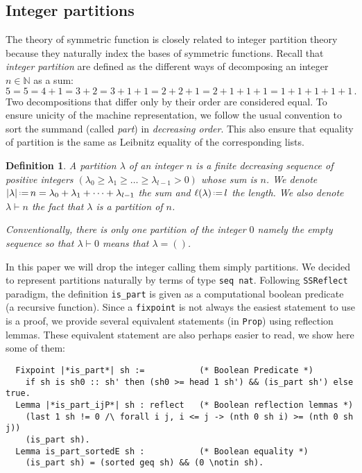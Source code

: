 \documentclass[12pt]{article}
\let\verb=\lstinline
\newcommand{\SSR}{\texttt{SSReflect}\xspace}
\newcommand{\N}{{\mathbb N}}
\newcommand{\partof}{\vdash}                    % Partition de
\newcommand{\eqdef}{\mbox{\,\raisebox{0.2ex}{\scriptsize\ensuremath{\mathrm:}}\ensuremath{=}\,}} %
\newtheorem{DEFN}{Definition}
\begin{document}
\subsection{Integer partitions}

The theory of symmetric function is closely related to integer partition
theory because they naturally index the bases of symmetric functions. Recall
that \emph{integer partition} are defined as the different ways of decomposing
an integer $n\in\N$ as a sum:
\[ 5=5=4+1=3+2=3+1+1=2+2+1=2+1+1+1=1+1+1+1+1\,. \] Two decompositions that
differ only by their order are considered equal. To ensure unicity of the
machine representation, we follow the usual convention to sort the summand
(called \emph{part}) in \emph{decreasing order}. This also ensure that
equality of partition is the same as Leibnitz equality of the corresponding
lists.
\begin{DEFN}
  A \emph{partition} $\lambda$ of an integer $n$ is a finite
  decreasing sequence of positive integers
  $(\lambda_0\geq\lambda_1\geq\dots\geq\lambda_{l-1} > 0)$ whose sum is
  $n$. We denote $|\lambda| \eqdef n = \lambda_0+\lambda_1+\dots+\lambda_{l-1}$
  the sum and $\ell(\lambda) \eqdef l$ the length. We also denote
  $\lambda\partof n$ the fact that $\lambda$ is a partition of $n$.

  Conventionally, there is only one partition of the integer $0$ namely
  the empty sequence so that $\lambda\partof0$ means that $\lambda = ()$.
\end{DEFN}
In this paper we will drop the integer calling them simply partitions. We
decided to represent partitions naturally by terms of type \verb+seq nat+.
Following \SSR paradigm, the definition \verb|is_part| is given as a
computational boolean predicate (a recursive function). Since a
\verb{fixpoint} is not always the easiest statement to use is a proof, we
provide several equivalent statements (in \verb|Prop|) using reflection
lemmas. These equivalent statement are also perhaps easier to read, we show
here some of them:
\begin{lstlisting}
  Fixpoint |*is_part*| sh :=           (* Boolean Predicate *)
    if sh is sh0 :: sh' then (sh0 >= head 1 sh') && (is_part sh') else true.
  Lemma |*is_part_ijP*| sh : reflect   (* Boolean reflection lemmas *)
    (last 1 sh != 0 /\ forall i j, i <= j -> (nth 0 sh i) >= (nth 0 sh j))
    (is_part sh).
  Lemma is_part_sortedE sh :           (* Boolean equality *)
    (is_part sh) = (sorted geq sh) && (0 \notin sh).
\end{lstlisting}
\end{document}
